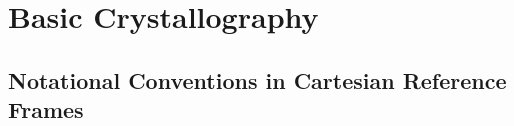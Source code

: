 % 
%
%
%
%
\renewcommand{\chaptergraphicspath}{src/Crystallography/eps/}
\chapterimage{\noheaderimage}
\renewcommand{\chabbr}{BASCRY}

\chapter{Basic Crystallography}

\section{Notational Conventions in Cartesian Reference Frames}

